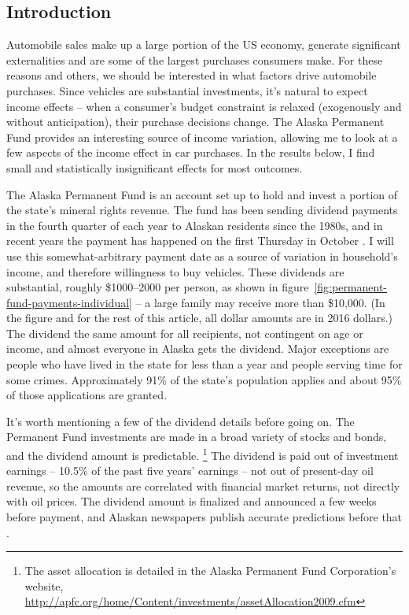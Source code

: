 \documentclass[11pt,letterpaper,oneside]{article}
\begin{document}
\pagebreak
\setcounter{page}{1}
\begin{doublespacing}
\section{Introduction}

Automobile sales make up a large portion of the US economy, generate significant externalities and are some of the largest purchases consumers make.
For these reasons and others, we should be interested in what factors drive automobile purchases.
Since vehicles are substantial investments, it's natural to expect income effects -- when a consumer's budget constraint is relaxed (exogenously and without anticipation), their purchase decisions change.
The  Alaska Permanent Fund provides an interesting source of income variation, allowing me to look at a few aspects of the income effect in car purchases.
In the results below, I find small and statistically insignificant effects for most outcomes.

The Alaska Permanent Fund is an account set up to hold and invest a portion of the state's mineral rights revenue.
The fund has been sending dividend payments in the fourth quarter of each year to Alaskan residents since the 1980s, and in recent years the payment has happened on the first Thursday in October \parencite{hsieh2003}.
I will use this somewhat\hyp{}arbitrary payment date as a source of variation in household's income, and therefore willingness to buy vehicles.
These dividends are substantial, roughly \$1000--2000 per person, as shown in figure~\ref{fig:permanent-fund-payments-individual} \parencite{apfd_payments_summary} -- a large family may receive more than \$10,000.
(In the figure and for the rest of this article, all dollar amounts are in 2016 dollars.)
The dividend the same amount for all recipients, not contingent on age or income, and almost everyone in Alaska gets the dividend.
Major exceptions are people who have lived in the state for less than a year and people serving time for some crimes.
Approximately 91\% of the state's population applies and about 95\% of those applications are granted.

It's worth mentioning a few of the dividend details before going on.
The Permanent Fund investments are made in a broad variety of stocks and bonds, and the dividend amount is predictable.%
\footnote{The asset allocation is detailed in the Alaska Permanent Fund Corporation's website, \url{http://apfc.org/home/Content/investments/assetAllocation2009.cfm}}
The dividend is paid out of investment earnings -- 10.5\% of the past five years' earnings -- not out of present\hyp{}day oil revenue, so the amounts are correlated with financial market returns, not directly with oil prices.
The dividend amount is finalized and announced a few weeks before payment, and Alaskan newspapers publish accurate predictions before that \parencite{adn_dividend_prediction, adn_dividend_realization}.


\end{doublespacing}
\end{document}
